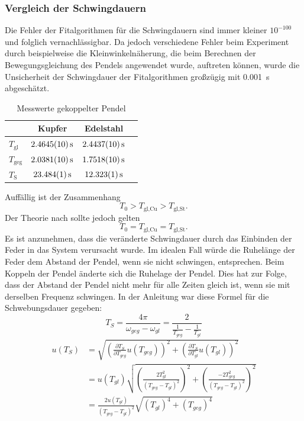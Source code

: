 \documentclass[
	a4paper,
	12pt,
	pagesize,
	ngerman
]{scrartcl}
\begin{document}
	\subsubsection{Vergleich der Schwingdauern}
	\label{Vergleich der Schwingdauern}
	Die Fehler der Fitalgorithmen für die Schwingdauern sind immer kleiner $10^{-100}$ und folglich vernachlässigbar. Da jedoch verschiedene Fehler beim Experiment durch beispielweise die Kleinwinkelnäherung, die beim Berechnen der Bewegungsgleichung des Pendels angewendet wurde, auftreten können, wurde die Unsicherheit der Schwingdauer der Fitalgorithmen großzügig mit \SI{0,001}{s} abgeschätzt.
	\begin{table}[H]
	\centering
	\begin{tabular}{ l | c | c | c |}
		& Kupfer & Edelstahl  \\ \hline
		$T_\text{gl} $ &$\SI{2,4645 \pm 0,001}{s}$&$\SI{2,4437 \pm 0,001}{s}$\\  
		$T_\text{geg} $ &$\SI{2,0381 \pm 0,001}{s}$&$\SI{1,7518 \pm 0,001}{s}$\\  
		$T_\text{S} $ &$\SI{23,484 \pm 0,001}{s}$&$\SI{12,323 \pm 0,001}{s}$ \\ \hline
	\end{tabular}
	\caption{Messwerte gekoppelter Pendel}
	\end{table}
	\noindent{}Auffällig ist der Zusammenhang
	\begin{equation}
		T_0 >  T_\text{gl,Cu} > T_\text{gl,St}.
	\end{equation}
	Der Theorie nach sollte jedoch gelten 
	\begin{equation}
		T_0 =  T_\text{gl,Cu} = T_\text{gl,St}.
	\end{equation}
	Es ist anzunehmen, dass die veränderte Schwingdauer durch das Einbinden der Feder in das System verursacht wurde. Im idealen Fall würde die Ruhelänge der Feder dem Abstand der Pendel, wenn sie nicht schwingen, entsprechen. Beim Koppeln der Pendel änderte sich die Ruhelage der Pendel. Dies hat zur Folge, dass der Abstand der Pendel nicht mehr für alle Zeiten gleich ist, wenn sie mit derselben Frequenz schwingen.
	\newline
	\noindent{}In der Anleitung war diese Formel für die Schwebungsdauer gegeben:
	\begin{equation}
		T_S = \frac{4\pi}{\omega_{geg}-\omega_{gl}} = \frac{2}{\frac{1}{T_{geg}} - \frac{1}{T_{gl}}}
	\end{equation}
	\begin{align}
		u(T_S) &= \sqrt{\left(\frac{\partial T_S}{\partial T_{geg}}u(T_{geg}) \right)^2 + \left(\frac{\partial T_S}{\partial T_{gl}}u(T_{gl}) \right)^2 } \\
		&= u(T_{gl})\sqrt{\left(\frac{2T_{gl}^2}{(T_{geg}-T_{gl})^2} \right)^2 + \left(\frac{-2T_{geg}^2}{(T_{geg}-T_{gl})^2} \right)^2 } \\
		&= \frac{2u(T_{gl})}{(T_{geg}-T_{gl})^2}\sqrt{(T_{gl})^4 + (T_{geg})^4 } 
	\end{align}
\end{document}
